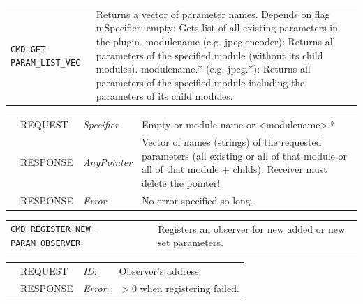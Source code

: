 \vspace{1 cm}

\noindent
\begin{tabularx}{\textwidth}{|p{3.6cm}|X|}
	\cline{1-1}\cline{2-2}
	  \lstinline|CMD_GET_ PARAM_LIST_VEC| & Returns a vector of parameter names.  \newline Depends on flag mSpecifier:  \newline  empty: Gets list of all existing parameters in the plugin.  \newline  modulename (e.g. jpeg.encoder): Returns all parameters of the specified module (without its child modules).  \newline  modulename.* (e.g. jpeg.*): Returns all parameters of the specified module including the parameters of its child modules.\\
\end{tabularx}
\begin{tabularx}{\textwidth}{|p{3.6cm}|p{2.3cm}|p{2cm}|X|}
	\cline{1-1}\cline{2-2}\cline{3-3}\cline{4-4}
	   &  REQUEST     &  {\em Specifier}   &  Empty or module name or \newline\mbox{\textless modulename\textgreater.*}   \\
	\cline{1-1}\cline{2-2}\cline{3-3}\cline{4-4}                        &  RESPONSE    &  {\em AnyPointer}  & Vector of names (strings) of the requested parameters (all existing or all of that module or all of that module + childs). \newline Receiver must delete the pointer! \\
	\cline{1-1}\cline{2-2}\cline{3-3}\cline{4-4}                        &  RESPONSE    &  {\em Error}  &  No error specified so long. \\
	\hline
\end{tabularx}

\vspace{1 cm}

\noindent
\begin{tabularx}{\textwidth}{|p{4cm}|X|}
	\cline{1-1}\cline{2-2}
	  \lstinline|CMD_REGISTER_NEW_ PARAM_OBSERVER| & Registers an observer for new added or new set parameters.  \\
\end{tabularx}
\begin{tabularx}{\textwidth}{|p{4cm}|p{2.3cm}|p{2cm}|X|}
	\cline{1-1}\cline{2-2}\cline{3-3}\cline{4-4}
	 &  REQUEST     &  {\em ID}:    &  Observer's address.   \\
	\cline{1-1}\cline{2-2}\cline{3-3}\cline{4-4}                                      &  RESPONSE    &  {\em Error}:        &  $>0$ when registering failed.  \\
	\hline
\end{tabularx}

